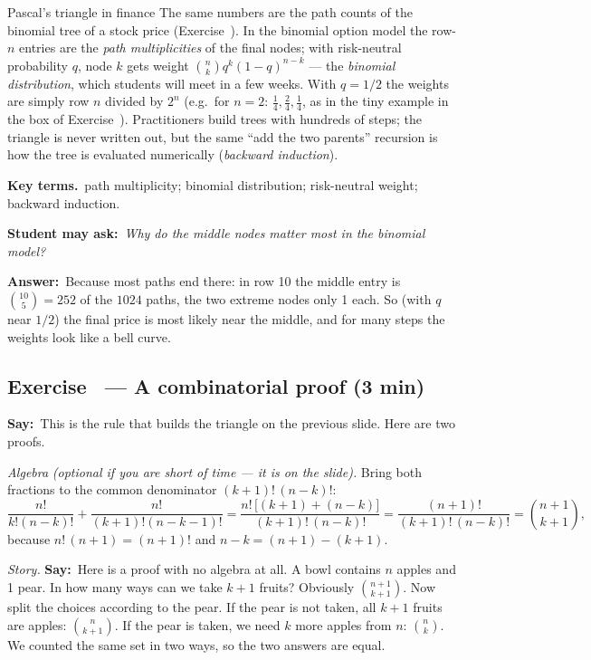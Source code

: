 \documentclass[11pt,a4paper,parskip=half]{scrartcl}
\newcommand{\terms}{\par\textbf{\color{plum}Key terms.}\ }
\newcommand{\sq}[1]{\par\textbf{\color{plum}Student may ask:}\ \emph{#1}\par}
\newcommand{\ans}{\textbf{Answer:}\ }
\newcommand{\say}{\textbf{\color{teal}Say:}\ }
\newcommand{\slide}[1]{\marginpar{\raggedright\footnotesize\color{gray}slide #1}}
\begin{document}
\begin{bg}{Pascal's triangle in finance}
	The same numbers are the path counts of the binomial tree of a stock
	price (Exercise~). In the binomial option model the row-$n$
	entries are the \emph{path multiplicities} of the final nodes; with risk-neutral probability $q$, node
	$k$ gets weight $\binom nk q^k(1-q)^{n-k}$ --- the \emph{binomial
		distribution}, which students will meet in a few weeks. With $q=1/2$ the
	weights are simply row $n$ divided by $2^n$ (e.g.\ for $n=2$:
	$\frac14,\frac24,\frac14$, as in the tiny example in the box of
	Exercise~). Practitioners
	build trees with hundreds of steps; the triangle is never written out, but
	the same ``add the two parents'' recursion is how the tree is evaluated
	numerically (\emph{backward induction}).

	\terms path multiplicity; binomial distribution; risk-neutral weight;
	backward induction.

	\sq{Why do the middle nodes matter most in the binomial model?}
	\ans Because most paths end there: in row 10 the middle entry is
	$\binom{10}{5} = 252$ of the $1024$ paths, the two extreme nodes only 1
	each. So (with $q$ near $1/2$) the final price is most likely near the
	middle, and for many steps the weights look like a bell curve.
\end{bg}

\subsection{Exercise~ --- A combinatorial proof (3 min)}\slide{20}


\say This is the rule that builds the triangle on the previous slide. Here
are two proofs.

\emph{Algebra} \emph{(optional if you are short of time --- it is on the
	slide).} Bring both fractions to the common denominator $(k+1)!\,(n-k)!$:
\[ \frac{n!}{k!(n-k)!}+\frac{n!}{(k+1)!(n-k-1)!}
	= \frac{n!\,\big[(k+1)+(n-k)\big]}{(k+1)!\,(n-k)!}
	= \frac{(n+1)!}{(k+1)!\,(n-k)!} = \binom{n+1}{k+1}, \]
because $n!\,(n+1) = (n+1)!$ and $n-k = (n+1)-(k+1)$.

\emph{Story.} \say Here is a proof with no algebra at all. A bowl contains
$n$ apples and 1 pear. In how many ways can we take $k+1$ fruits? Obviously
$\binom{n+1}{k+1}$. Now split the choices according to the pear. If the pear
is not taken, all $k+1$ fruits are apples: $\binom n{k+1}$. If the pear is
taken, we need $k$ more apples from $n$: $\binom nk$. We counted the same set
in two ways, so the two answers are equal.
\end{document}

